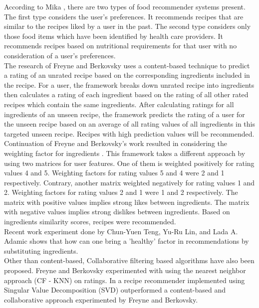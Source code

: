 \noindent According to Mika \cite{44}, there are two types of food recommender systems present. The first type considers the user's preferences. It recommends recipes that are similar to the recipes liked by a user in the past. The second type considers only those food items which have been identified by health care providers. It recommends recipes based on nutritional requirements for that user with no consideration of a user's preferences.
\\
\noindent The research of Freyne and Berkovsky \cite{13} uses a content-based technique to predict a rating of an unrated recipe based on the corresponding ingredients included in the recipe. For a user, the framework breaks down unrated recipe into ingredients then calculates a rating of each ingredient based on the rating of all other rated recipes which contain the same ingredients. After calculating ratings for all ingredients of an unseen recipe, the framework predicts the rating of a user for the unseen recipe based on an average of all rating values of all ingredients in this targeted unseen recipe. Recipes with high prediction values will be recommended.
\\
\noindent Continuation of Freyne and Berkovsky's \cite{13} work resulted in considering the weighting factor for ingredients \cite{15}. This framework takes a different approach by using two matrices for user features. One of them is weighted positively for rating values 4 and 5. Weighting factors for rating values 5 and 4 were 2 and 1 respectively. Contrary, another matrix weighted negatively for rating values 1 and 2. Weighting factors for rating values 2 and 1 were 1 and 2 respectively. The matrix with positive values implies strong likes between ingredients. The matrix with negative values implies strong dislikes between ingredients. Based on ingredients similarity scores, recipes were recommended.
\\
\noindent Recent work experiment done by Chun-Yuen Teng, Yu-Ru Lin, and Lada A. Adamic \cite{17} shows that how can one bring a 'healthy' factor in recommendations by substituting ingredients.
\\
\noindent Other than content-based, Collaborative filtering based algorithms have also been proposed. Freyne and Berkovsky experimented with using the nearest neighbor approach (CF - KNN) on ratings. In \cite{15} a recipe recommender implemented using Singular Value Decomposition (SVD) outperformed a content-based and collaborative approach experimented by Freyne and Berkovsky.
\\
